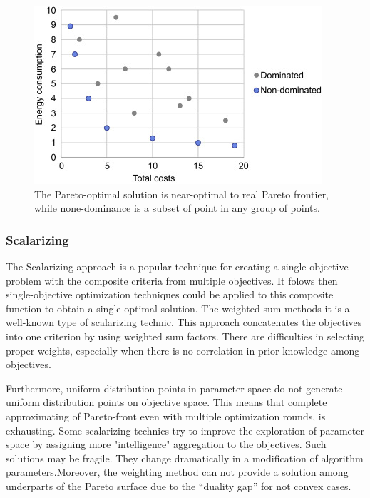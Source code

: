                 \begin{figure}
                    \centering
                    \includegraphics{content/images/dominated}
                    \caption[Pareto-optimal points vs. none dominated]{The Pareto-optimal solution is near-optimal to real Pareto frontier, while none-dominance is a subset of point in any group of points.}
                    \label{fig:dominated}
                \end{figure}
        
            \subsubsection{Scalarizing}
                The Scalarizing approach is a popular technique for creating a single-objective problem with the composite criteria from multiple objectives. It folows then single-objective optimization techniques could be applied to this composite function to obtain a single optimal solution. The weighted-sum methods it is a well-known type of scalarizing technic. This approach concatenates the objectives into one criterion by using weighted sum factors. There are difficulties in selecting proper weights, especially when there is no correlation in prior knowledge among objectives.  
                
                
                Furthermore, uniform distribution points in parameter space do not generate uniform distribution points on objective space. This means that complete approximating of Pareto-front even with multiple optimization rounds, is exhausting.
                Some scalarizing technics try to improve the exploration of parameter space by assigning more "intelligence" aggregation to the objectives. Such solutions may be fragile. They change dramatically in a modification of algorithm parameters.Moreover, the weighting method can not provide a solution among underparts of the Pareto surface due to the “duality gap” for not convex cases. 

